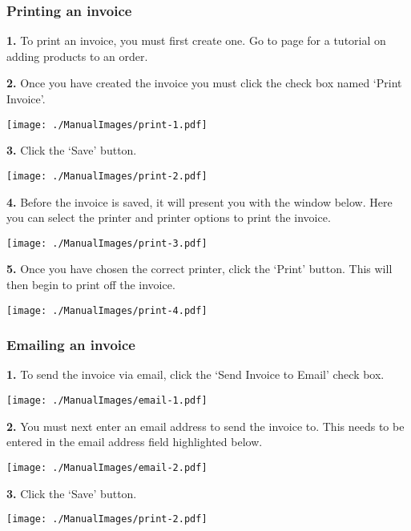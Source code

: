 \subsubsection{Printing an invoice}
\label{fig:Printing an invoice}

\textbf{1.} To print an invoice, you must first create one. Go to page \pageref{fig:Adding products to an order} for a tutorial on adding products to an order.

\textbf{2.} Once you have created the invoice you must click the check box named `Print Invoice'.

\texttt{[image: ./ManualImages/print-1.pdf]}

\pagebreak

\textbf{3.} Click the `Save' button.

\texttt{[image: ./ManualImages/print-2.pdf]}

\pagebreak

\textbf{4.} Before the invoice is saved, it will present you with the window below. Here you can select the printer and printer options to print the invoice.

\texttt{[image: ./ManualImages/print-3.pdf]}

\pagebreak

\textbf{5.} Once you have chosen the correct printer, click the `Print' button. This will then begin to print off the invoice.

\texttt{[image: ./ManualImages/print-4.pdf]}

\pagebreak
\subsubsection{Emailing an invoice}
\label{fig:Emailing an invoice}

\textbf{1.} To send the invoice via email, click the `Send Invoice to Email' check box.

\texttt{[image: ./ManualImages/email-1.pdf]}

\textbf{2.} You must next enter an email address to send the invoice to. This needs to be entered in the email address field highlighted below.

\texttt{[image: ./ManualImages/email-2.pdf]}

\pagebreak

\textbf{3.} Click the `Save' button.

\texttt{[image: ./ManualImages/print-2.pdf]}

